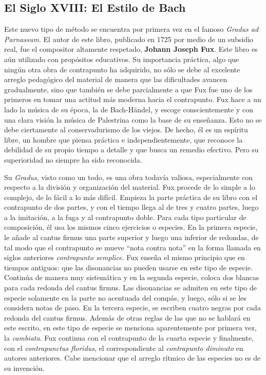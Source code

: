 \documentclass[letterpaper,12pt]{book}
\theoremstyle{definition} \newtheorem{Def}{Definición}[chapter]
\theoremstyle{definition} \newtheorem{Teo}{Teorema}[chapter]
\theoremstyle{definition} \newtheorem{Pro}{Proposición}[chapter]
\theoremstyle{definition} \newtheorem{Lema}{Lema}[chapter]
\begin{document}
\subsection{El Siglo XVIII: El Estilo de Bach}

Este nuevo tipo de método se encuentra por primera vez en el famoso \emph{Gradus ad Parnassum}. El autor de este libro, publicado en 1725 por medio de un subsidio real, fue el compositor altamente respetado, \textbf{Johann Joseph Fux}. Este libro es aún utilizado con propósitos educativos. Su importancia práctica, algo que ningún otra obra de contrapunto ha adquirido, no sólo se debe al excelente arreglo pedagógico del material de manera que las dificultades avancen gradualmente, sino que también se debe parcialmente a que Fux fue uno de los primeros en tomar una actitud más moderna hacia el contrapunto. Fux hace a un lado la música de su época, la de Bach-Händel, y escoge conscientemente y con una clara visión la música de Palestrina como la base de su enseñanza. Esto no se debe ciertamente al conservadurismo de los viejos. De hecho, él es un espíritu libre, un hombre que piensa práctica e independientemente, que reconoce la debilidad de su propio tiempo a detalle y que busca un remedio efectivo. Pero su superioridad no siempre ha sido reconocida. 

Su \emph{Gradus}, visto como un todo, es una obra todavía valiosa, especialmente con respecto a la división y organización del material. Fux procede de lo simple a lo complejo, de lo fácil a lo más difícil. Empieza la parte práctica de su libro con el contrapunto de dos partes, y con el tiempo llega al de tres y cuatro partes, luego a la imitación, a la fuga y al contrapunto doble. Para cada tipo particular de composición, él usa los mismos cinco ejercicios o especies. En la primera especie, le añade al cantus firmus una parte superior y luego una inferior de redondas, de tal modo que el contrapunto se mueve ``nota contra nota'' en la forma llamada en siglos anteriores \emph{contrapunto semplice}. Fux enseña el mismo principio que en tiempos antiguos: que las disonancias no pueden usarse en este tipo de especie. Continúa de manera muy sistemática y en la segunda especie, coloca dos blancas para cada redonda del cantus firmus. Las disonancias se admiten en este tipo de especie solamente en la parte no acentuada del compás, y luego, sólo si se les considera notas de paso. En la tercera especie, se escriben cuatro negras por cada redonda del cantus firmus. Además de otras reglas de las que no se hablará en este escrito, en este tipo de especie se menciona aparentemente por primera vez, la \emph{cambiata}. Fux continua con el contrapunto de la cuarta especie y finalmente, con el \emph{contrapunctus floridus}, el correspondiente al \emph{contrapunto diminuto} en autores anteriores. Cabe mencionar que el arreglo rítmico de las especies no es de su invención. 
\end{document}
